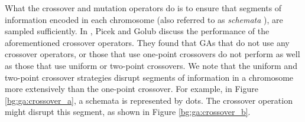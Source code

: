 \documentclass[12pt, twoside, a4paper]{report}
\begin{document}
What the crossover and mutation operators do is to ensure that segments of information encoded in each chromosome (also referred to as \textit{schemata} \cite{RefWorks:224}), are sampled sufficiently. In \cite{RefWorks:224}, Picek and Golub discuss the performance of the aforementioned crossover operators. They found that GAs that do not use any crossover operators, or those that use one-point crossovers do not perform as well as those that use uniform or two-point crossovers. We note that the uniform and two-point crossover strategies disrupt segments of information in a chromosome more extensively than the one-point crossover. For example, in Figure \ref{bg:ga:crossover_a}, a schemata is represented by dots. The crossover operation might disrupt this segment, as shown in Figure \ref{bg:ga:crossover_b}.

\end{document}
